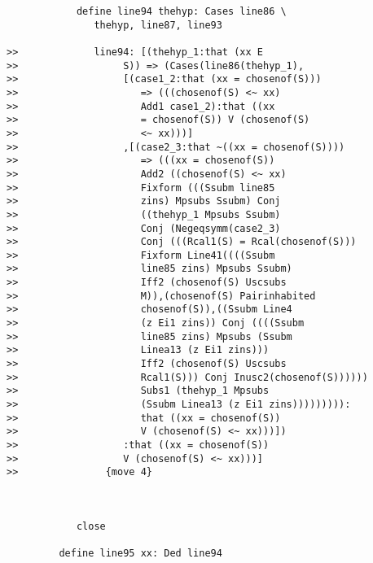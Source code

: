 \documentclass[12pt]{article}
\begin{document}
\begin{verbatim}
            define line94 thehyp: Cases line86 \
               thehyp, line87, line93

>>             line94: [(thehyp_1:that (xx E
>>                  S)) => (Cases(line86(thehyp_1),
>>                  [(case1_2:that (xx = chosenof(S)))
>>                     => (((chosenof(S) <~ xx)
>>                     Add1 case1_2):that ((xx
>>                     = chosenof(S)) V (chosenof(S)
>>                     <~ xx)))]
>>                  ,[(case2_3:that ~((xx = chosenof(S))))
>>                     => (((xx = chosenof(S))
>>                     Add2 ((chosenof(S) <~ xx)
>>                     Fixform (((Ssubm line85
>>                     zins) Mpsubs Ssubm) Conj
>>                     ((thehyp_1 Mpsubs Ssubm)
>>                     Conj (Negeqsymm(case2_3)
>>                     Conj (((Rcal1(S) = Rcal(chosenof(S)))
>>                     Fixform Line41((((Ssubm
>>                     line85 zins) Mpsubs Ssubm)
>>                     Iff2 (chosenof(S) Uscsubs
>>                     M)),(chosenof(S) Pairinhabited
>>                     chosenof(S)),((Ssubm Line4
>>                     (z Ei1 zins)) Conj ((((Ssubm
>>                     line85 zins) Mpsubs (Ssubm
>>                     Linea13 (z Ei1 zins)))
>>                     Iff2 (chosenof(S) Uscsubs
>>                     Rcal1(S))) Conj Inusc2(chosenof(S))))))
>>                     Subs1 (thehyp_1 Mpsubs
>>                     (Ssubm Linea13 (z Ei1 zins))))))))):
>>                     that ((xx = chosenof(S))
>>                     V (chosenof(S) <~ xx)))])
>>                  :that ((xx = chosenof(S))
>>                  V (chosenof(S) <~ xx)))]
>>               {move 4}



            close

         define line95 xx: Ded line94


\end{verbatim}
\end{document}

